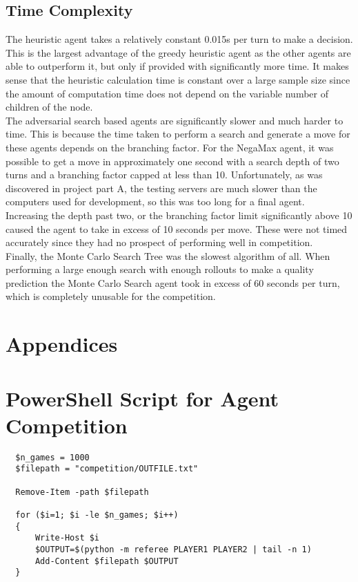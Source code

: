 \documentclass{article}
\begin{document}
\subsection{Time Complexity}
The heuristic agent takes a relatively constant 0.015s per turn to make a decision. This is the largest advantage of the greedy heuristic agent as the other agents are able to outperform it, but only if provided with significantly more time. It makes sense that the heuristic calculation time is constant over a large sample size since the amount of computation time does not depend on the variable number of children of the node.\\[2mm]
The adversarial search based agents are significantly slower and much harder to time. This is because the time taken to perform a search and generate a move for these agents depends on the branching factor. For the NegaMax agent, it was possible to get a move in approximately one second with a search depth of two turns and a branching factor capped at less than 10. Unfortunately, as was discovered in project part A, the testing servers are much slower than the computers used for development, so this was too long for a final agent.\\[2mm]
Increasing the depth past two, or the branching factor limit significantly above 10 caused the agent to take in excess of 10 seconds per move. These were not timed accurately since they had no prospect of performing well in competition.\\[2mm]
Finally, the Monte Carlo Search Tree was the slowest algorithm of all. When performing a large enough search with enough rollouts to make a quality prediction the Monte Carlo Search agent took in excess of 60 seconds per turn, which is completely unusable for the competition.

\section*{Appendices}
\appendix
\section{PowerShell Script for Agent Competition}
\label{app: PowerShell}
\begin{listing}[h!]
\begin{verbatim}
  $n_games = 1000
  $filepath = "competition/OUTFILE.txt"
  
  Remove-Item -path $filepath
  
  for ($i=1; $i -le $n_games; $i++)
  {
      Write-Host $i
      $OUTPUT=$(python -m referee PLAYER1 PLAYER2 | tail -n 1)
      Add-Content $filepath $OUTPUT
  }
\end{verbatim}
\end{listing}

\newpage
\printbibliography
\end{document}
